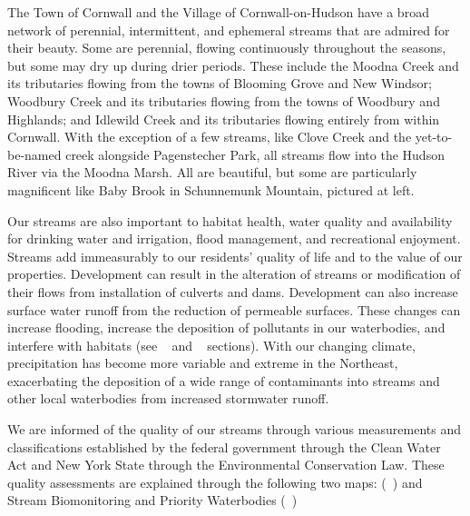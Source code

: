 The Town of Cornwall and the Village of Cornwall-on-Hudson have a broad network 
of perennial, intermittent, and ephemeral streams that are admired for their 
beauty. Some are perennial, flowing continuously throughout the seasons, but 
some may dry up during drier periods. These include the Moodna Creek and its 
tributaries flowing from the towns of Blooming Grove and New Windsor; Woodbury 
Creek and its tributaries flowing from the towns of Woodbury and Highlands; and 
Idlewild Creek and its tributaries flowing entirely from within Cornwall. With 
the exception of a few streams, like Clove Creek and the yet-to-be-named creek 
alongside Pagenstecher Park, all streams flow into the Hudson River via the 
Moodna Marsh. All are beautiful, but some are particularly magnificent like Baby 
Brook in Schunnemunk Mountain, pictured at left.

Our streams are also important to habitat health, water quality and 
availability for drinking water and irrigation, flood management, and 
recreational enjoyment. Streams add immeasurably to our residents’ quality of 
life and to the value of our properties. Development can result in the 
alteration of streams or modification of their flows from installation of 
culverts and dams. Development can also increase surface water runoff from the 
reduction of permeable surfaces. These changes can increase flooding, increase 
the deposition of pollutants in our waterbodies, and interfere with habitats 
(see ~ and 
~ sections). With our changing climate, 
precipitation has become more variable and extreme in the Northeast, 
exacerbating the deposition of a wide range of contaminants into streams and 
other local waterbodies from increased stormwater runoff.

We are informed of the quality of our streams through various measurements and 
classifications established by the federal government through the Clean Water 
Act and New York State through the Environmental Conservation Law. These 
quality assessments are explained through the following two maps: 
(~) and Stream Biomonitoring and 
Priority Waterbodies (~)


